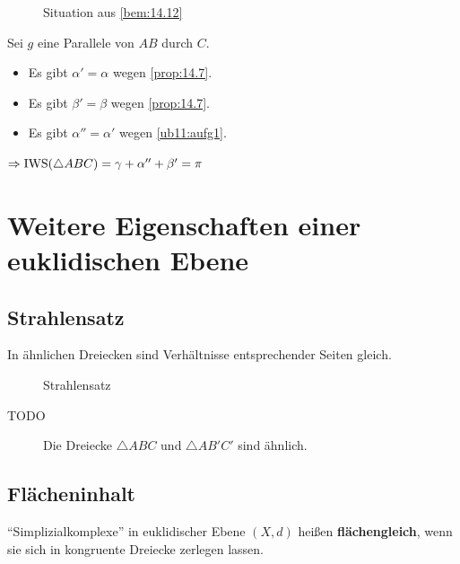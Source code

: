 \begin{figure}[htp]
    \centering
    
    \caption{Situation aus \cref{bem:14.12}}
    \label{fig:14.12}
\end{figure}

\begin{beweis}
    Sei $g$ eine Parallele von $AB$ durch $C$. 

    \begin{itemize}
        \item Es gibt $\alpha' = \alpha$ wegen \cref{prop:14.7}.
        \item Es gibt $\beta' = \beta$ wegen \cref{prop:14.7}.
        \item Es gibt $\alpha'' = \alpha'$ wegen \cref{ub11:aufg1}.
    \end{itemize}
    $\Rightarrow \operatorname{IWS}(\triangle ABC) = \gamma + \alpha'' + \beta' = \pi$
\end{beweis}

\section{Weitere Eigenschaften einer euklidischen Ebene}
\subsection{Strahlensatz}
\begin{satz}
    In ähnlichen Dreiecken sind Verhältnisse entsprechender Seiten gleich.
\end{satz}

\begin{figure}[htp]
    \centering
    
    \caption{Strahlensatz}
    \label{fig:bild-2}
\end{figure}

\begin{beweis}
    TODO
\end{beweis}

\begin{figure}[htp]
    \centering
    
    \caption{Die Dreiecke $\triangle ABC$ und $\triangle AB'C'$ sind ähnlich.}
    \label{fig:bild-3}
\end{figure}

\subsection{Flächeninhalt}
\begin{definition}
    \enquote{Simplizialkomplexe} in euklidischer Ebene $(X,d)$ heißen
    \textbf{flächengleich},
    wenn sie sich in kongruente Dreiecke zerlegen lassen.
\end{definition}

